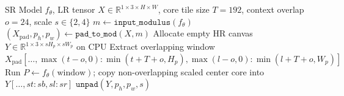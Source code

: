 \documentclass[10pt,onecolumn,journal]{IEEEtran}
\begin{document}
\begin{algorithm}[t]
\caption{Memory-Safe Modulus-Aligned Overlapping Tiled Inference (\texttt{tiled\_forward})}
\label{alg:tiling}
\begin{algorithmic}[1]
\REQUIRE SR Model $f_{\theta}$, LR tensor $X \in \mathbb{R}^{1 \times 3 \times H \times W}$, core tile size $T=192$, context overlap $o=24$, scale $s \in \{2,4\}$
\STATE $m \leftarrow \texttt{input\_modulus}(f_{\theta})$ 
\STATE $(X_{\mathrm{pad}}, p_h, p_w) \leftarrow \texttt{pad\_to\_mod}(X, m)$ 
\STATE Allocate empty HR canvas $Y \in \mathbb{R}^{1 \times 3 \times sH_p \times sW_p}$ on CPU 
    \STATE Extract overlapping window $X_{\mathrm{pad}}[\dots, \max(t-o,0):\min(t+T+o,H_p), \max(l-o,0):\min(l+T+o,W_p)]$
    \STATE Run $P \leftarrow f_{\theta}(\text{window})$; copy non-overlapping scaled center core into $Y[\dots, st:sb, sl:sr]$
\ENDFOR
\RETURN $\texttt{unpad}(Y, p_h, p_w, s)$ 
\end{algorithmic}
\end{algorithm}
\end{document}
